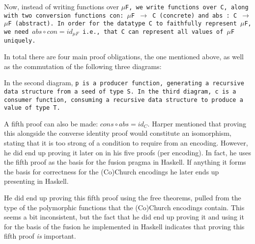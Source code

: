 Now, instead of writing functions over \tt{$\mu$F}, we write functions over \tt{C}, along with two conversion functions \tt{con: $\mu$F $\to$ C} (concrete) and \tt{abs : C $\to$ $\mu$F} (abstract).
In order for the datatype \tt{C} to faithfully represent \tt{$\mu$F}, we need $abs \circ con = id_{\mu F}$ i.e., that \tt{C} can represent all values of \tt{$\mu$F} uniquely.

In total there are four main proof obligations, the one mentioned above, as well as the commutation of the following three diagrams:

\begin{figure}[H]\hfill
{}\hfill\null
{}\hfill\null
{}\hfill\null
\end{figure}

In the second diagram, \tt{p} is a producer function, generating a recursive data structure from a seed of type \tt{S}.
In the third diagram, \tt{c} is a consumer function, consuming a recursive data structure to produce a value of type \tt{T}.

A fifth proof can also be made: $cons \circ abs = id_C$.
Harper mentioned that proving this alongside the converse identity proof would constitute an isomorphism, stating that it is too strong of a condition to require from an encoding.
However, he did end up proving it later on in his five proofs (per encoding).
In fact, he uses the fifth proof as the basis for the fusion pragma in Haskell.
If anything it forms the basis for correctness for the (Co)Church encodings he later ends up presenting in Haskell.

He did end up proving this fifth proof using the free theorems, pulled from the type of the polymorphic functions that the (Co)Church encodings contain.
This seems a bit inconsistent, but the fact that he did end up proving it and using it for the basis of the fusion he implemented in Haskell indicates that proving this fifth proof \textit{is} important.

